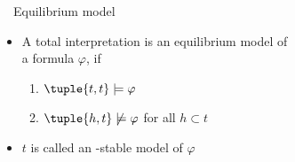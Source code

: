 \begin{frame}{\HTC\ \ Equilibrium model}
  \begin{itemize}
  \item A total interpretation  is an \alert{equilibrium model} of\\
    a formula $\varphi$,
    if
    \par
    \smallskip
    \begin{enumerate}\normalsize
    \item
      \(
      \tuple{t,t}\models\varphi
      \)
    \item
      \(
      \tuple{h,t}\not\models\varphi
      \)
      for all $h\subset t$
    \end{enumerate}
    \smallskip
  \item <2-> $t$ is called an \HTC-\alert{stable model} of $\varphi$
  \end{itemize}
\end{frame}
%
